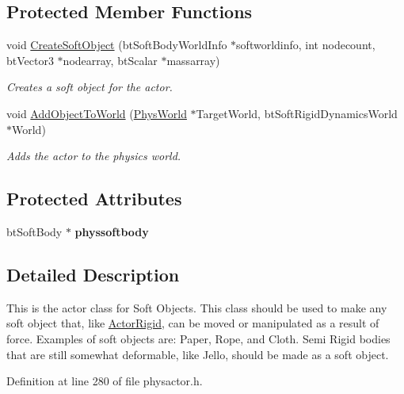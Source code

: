 \subsection*{Protected Member Functions}
\begin{DoxyCompactItemize}
\item 
void \hyperlink{classActorSoft_a01a570c728d6cb96d1a40003d6b17e22}{CreateSoftObject} (btSoftBodyWorldInfo $\ast$softworldinfo, int nodecount, btVector3 $\ast$nodearray, btScalar $\ast$massarray)
\begin{DoxyCompactList}\small\item\em Creates a soft object for the actor. \item\end{DoxyCompactList}\item 
void \hyperlink{classActorSoft_a0def29f28ed4d126a0634ddc97e33e2f}{AddObjectToWorld} (\hyperlink{classPhysWorld}{PhysWorld} $\ast$TargetWorld, btSoftRigidDynamicsWorld $\ast$World)
\begin{DoxyCompactList}\small\item\em Adds the actor to the physics world. \item\end{DoxyCompactList}\end{DoxyCompactItemize}
\subsection*{Protected Attributes}
\begin{DoxyCompactItemize}
\item 
\hypertarget{classActorSoft_aa7d4efd5150008eecc54e070be075700}{
btSoftBody $\ast$ {\bfseries physsoftbody}}
\label{d5/da4/classActorSoft_aa7d4efd5150008eecc54e070be075700}

\end{DoxyCompactItemize}


\subsection{Detailed Description}
This is the actor class for Soft Objects. This class should be used to make any soft object that, like \hyperlink{classActorRigid}{ActorRigid}, can be moved or manipulated as a result of force. Examples of soft objects are: Paper, Rope, and Cloth. Semi Rigid bodies that are still somewhat deformable, like Jello, should be made as a soft object. 

Definition at line 280 of file physactor.h.

